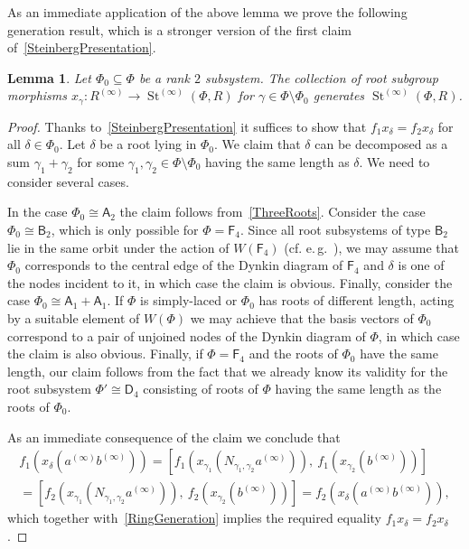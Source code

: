 \documentclass[oneside, 11pt]{amsart}
\numberwithin{equation}{section}
\newtheorem{lemma}{Lemma} \numberwithin{lemma}{section}
\theoremstyle{definition}
\theoremstyle{remark}
\DeclareMathOperator\St{St}
\newcommand{\rA}{\mathsf{A}}
\newcommand{\rB}{\mathsf{B}}
\newcommand{\rD}{\mathsf{D}}
\newcommand{\rF}{\mathsf{F}}
\begin{document}
As an immediate application of the above lemma we prove the following generation result, which is a stronger version of the first claim of~\cref{SteinbergPresentation}.
 \begin{lemma}\label{DoubleRootElimination}
  Let \(\Phi_0 \subseteq \Phi\) be a rank \(2\) subsystem.
  The collection of root subgroup morphisms $x_\gamma \colon R^{(\infty)} \to \St^{(\infty)}(\Phi, R)$ for $\gamma \in \Phi\setminus \Phi_0$ generates $\St^{(\infty)}(\Phi, R)$.
 \end{lemma}
 \begin{proof}
  Thanks to~\cref{SteinbergPresentation} it suffices to show that $f_1 x_\delta = f_2 x_\delta$ for all $\delta \in \Phi_0$.
  Let $\delta$ be a root lying in $\Phi_0$. We claim that $\delta$ can be decomposed as a sum $\gamma_1 + \gamma_2$ for some $\gamma_1,\gamma_2 \in \Phi\setminus\Phi_0$ having the same length as $\delta$.
  We need to consider several cases. 
  
  In the case \(\Phi_0 \cong \rA_2\) the claim follows from~\cref{ThreeRoots}.
  Consider the case $\Phi_0 \cong \rB_2$, which is only possible for $\Phi=\rF_4$.
  Since all root subsystems of type $\rB_2$ lie in the same orbit under the action of $W(\rF_4)$ (cf. e.\,g.~\cite[Table~8]{Ca72}), we may assume that $\Phi_0$ corresponds to the central edge of the Dynkin diagram of $\rF_4$ and $\delta$ is one of the nodes incident to it, in which case the claim is obvious.
  Finally, consider the case $\Phi_0 \cong \rA_1+\rA_1$. If $\Phi$ is simply-laced or $\Phi_0$ has roots of different length, acting by a suitable element of $W(\Phi)$ we may achieve that the basis vectors of $\Phi_0$ correspond to a pair of unjoined nodes of the Dynkin diagram of $\Phi$, in which case the claim is also obvious. Finally, if $\Phi=\rF_4$ and the roots of $\Phi_0$ have the same length, our claim follows from the fact that we already know its validity for the root subsystem $\Phi'\cong \rD_4$ consisting of roots of $\Phi$ having the same length as the roots of $\Phi_0$.
  
  As an immediate consequence of the claim we conclude that
  \begin{multline*} f_1(x_\delta(a^{(\infty)}b^{(\infty)})) = [f_1(x_{\gamma_1}(N_{\gamma_1, \gamma_2}a^{(\infty)})),\ f_1(x_{\gamma_2}(b^{(\infty)}))] \\
  = [f_2(x_{\gamma_1}(N_{\gamma_1, \gamma_2}a^{(\infty)})),\ f_2(x_{\gamma_2}(b^{(\infty)}))] = f_2(x_\delta(a^{(\infty)}b^{(\infty)})), \end{multline*}
  which together with~\cref{RingGeneration} implies the required equality $f_1 x_\delta = f_2 x_\delta$.
 \end{proof}
\end{document}
